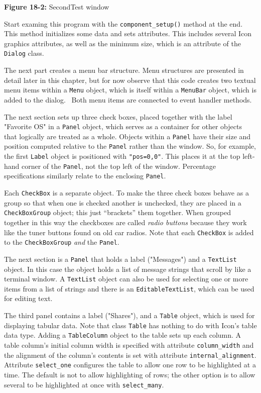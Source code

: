 {\sffamily\bfseries Figure 18-2:}
{\sffamily SecondTest window}

\bigskip

Start examing this program with the \texttt{component\_setup()}
method at the end. This method initializes some data and
sets attributes. This includes several Icon graphics attributes,
as well as the minimum size, which is an attribute of the
\texttt{Dialog} class.

The next part creates a menu bar structure.
Menu structures are presented in detail later in this chapter, but for
now observe that this code creates two textual menu items within a
\texttt{Menu} object, which is itself within a \texttt{MenuBar} object,
which is added to the dialog. \ Both menu items are connected to event
handler methods.

The next section sets up three check boxes,
placed together with the label "Favorite OS" in a \texttt{Panel} object,
which serves as a container for other objects that logically are treated
as a whole. Objects within a \texttt{Panel} have their size and
position computed relative
to the \texttt{Panel} rather than the window. So, for example, the
first \texttt{Label} object is positioned with
\texttt{"pos=0,0"}. This places it at the
top left-hand corner of the \texttt{Panel}, not the top left of the
window. Percentage specifications similarly relate to the enclosing
\texttt{Panel}.

Each \texttt{CheckBox} is a separate object. To make the three check
boxes behave as a group so that when one is checked
another is unchecked, they are placed in a
\texttt{CheckBoxGroup} object; this just
``brackets'' them together. When grouped
together in this way the checkboxes are called \textit{radio buttons} because they work like the
tuner buttons found on old car radios. Note that each
\texttt{CheckBox} is added to the \texttt{CheckBoxGroup} \textit{and}
the \texttt{Panel}.

The next section is a \texttt{Panel} that holds a label
("Messages") and a \texttt{TextList}
object. In this case the object holds a list of message
strings that scroll by like a terminal window. A \texttt{TextList}
object can also be used for selecting one or more items from a list of
strings and there is an \texttt{EditableTextList},
which can be used for editing text.

The third panel contains a label ("Shares"),
and a \texttt{Table} object, which is used for displaying tabular data.
Note that class \texttt{Table} has nothing to do with
Icon's table data type. Adding a \texttt{TableColumn}
object to the table sets up each column. A table column's
initial column width is specified with attribute \texttt{column\_width}
and the alignment of the column's contents is set with
attribute \texttt{internal\_alignment}. Attribute
\texttt{select\_one} configures the table to allow one row to
be highlighted at a time. The default is not to allow highlighting of
rows; the other option is to allow several to be highlighted at once
with \texttt{select\_many}.

